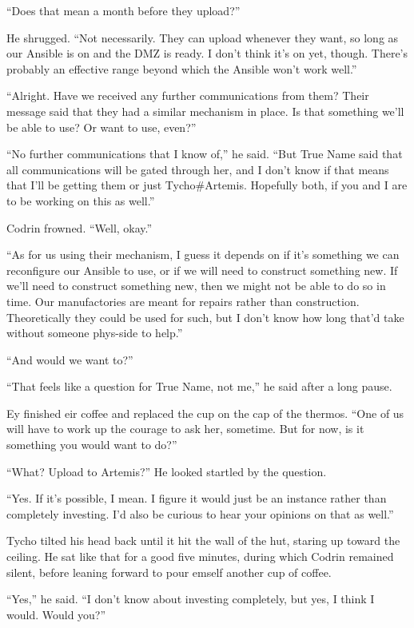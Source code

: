 ``Does that mean a month before they upload?''

He shrugged. ``Not necessarily. They can upload whenever they want, so long as our Ansible is on and the DMZ is ready. I don't think it's on yet, though. There's probably an effective range beyond which the Ansible won't work well.''

``Alright. Have we received any further communications from them? Their message said that they had a similar mechanism in place. Is that something we'll be able to use? Or want to use, even?''

``No further communications that I know of,'' he said. ``But True Name said that all communications will be gated through her, and I don't know if that means that I'll be getting them or just Tycho\#Artemis. Hopefully both, if you and I are to be working on this as well.''

Codrin frowned. ``Well, okay.''

``As for us using their mechanism, I guess it depends on if it's something we can reconfigure our Ansible to use, or if we will need to construct something new. If we'll need to construct something new, then we might not be able to do so in time. Our manufactories are meant for repairs rather than construction. Theoretically they could be used for such, but I don't know how long that'd take without someone phys-side to help.''

``And would we want to?''

``That feels like a question for True Name, not me,'' he said after a long pause.

Ey finished eir coffee and replaced the cup on the cap of the thermos. ``One of us will have to work up the courage to ask her, sometime. But for now, is it something you would want to do?''

``What? Upload to Artemis?'' He looked startled by the question.

``Yes. If it's possible, I mean. I figure it would just be an instance rather than completely investing. I'd also be curious to hear your opinions on that as well.''

Tycho tilted his head back until it hit the wall of the hut, staring up toward the ceiling. He sat like that for a good five minutes, during which Codrin remained silent, before leaning forward to pour emself another cup of coffee.

``Yes,'' he said. ``I don't know about investing completely, but yes, I think I would. Would you?''

